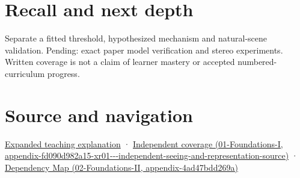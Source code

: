 \section{Recall and next depth}\label{appendix-8dc848f14052-recall-and-next-depth}

Separate a fitted threshold, hypothesized mechanism and natural-scene validation. Pending: exact paper model verification and stereo experiments. Written coverage is not a claim of learner mastery or accepted numbered-curriculum progress.

\section{Source and navigation}\label{appendix-8dc848f14052-source-and-navigation}

\href{Continuous\%20Notes/University\%20-\%20Worlds,\%20Images\%20and\%20Inference\%20-\%20Graphics,\%20Vision\%20and\%20Photography\#Binocular\%20depth\%20changes\%20the\%20optimization\%20question}{Expanded teaching explanation} · \href{../01-Foundations-I/main.pdf\#nameddest=appendix-fd090d982a15-xr01---independent-seeing-and-representation-source}{Independent coverage (01-Foundations-I, appendix-fd090d982a15-xr01-\/-\/-independent-seeing-and-representation-source)} · \href{../02-Foundations-II/main.pdf\#nameddest=appendix-4ad47bdd269a}{Dependency Map (02-Foundations-II, appendix-4ad47bdd269a)}
